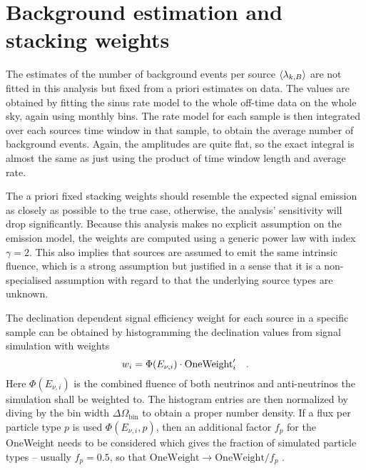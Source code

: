 \section{Background estimation and stacking weights}
The estimates of the number of background events per source $\Braket{\lambda_{k,B}}$ are not fitted in this analysis but fixed from a priori estimates on data.
The values are obtained by fitting the sinus rate model to the whole off-time data on the whole sky, again using monthly bins.
The rate model for each sample is then integrated over each sources time window in that sample, to obtain the average number of background events.
Again, the amplitudes are quite flat, so the exact integral is almost the same as just using the product of time window length and average rate.

The a priori fixed stacking weights should resemble the expected signal emission as closely as possible to the true case, otherwise, the analysis' sensitivity will drop significantly.
Because this analysis makes no explicit assumption on the emission model, the weights are computed using a generic power law with index $\gamma = 2$.
This also implies that sources are assumed to emit the same intrinsic fluence, which is a strong assumption but justified in a sense that it is a non-specialised assumption with regard to that the underlying source types are unknown.

The declination dependent signal efficiency weight for each source in a specific sample can be obtained by histogramming the declination values from signal simulation with weights
\begin{equation}
  w_i = \Phi(E_{\nu,i})\cdot\text{OneWeight}'_i
  \quad\text{.}
\end{equation}
Here $\Phi(E_{\nu,i})$ is the combined fluence of both neutrinos and anti-neutrinos the simulation shall be weighted to.
The histogram entries are then normalized by diving by the bin width $\Delta\Omega_\text{bin}$ to obtain a proper number density.
If a flux per particle type $p$ is used $\Phi(E_{\nu,i}, p)$, then an additional factor $f_p$ for the OneWeight needs to be considered which gives the fraction of simulated particle types – usually $f_p=0.5$, so that $\text{OneWeight}\rightarrow\text{OneWeight}/f_p$ .

